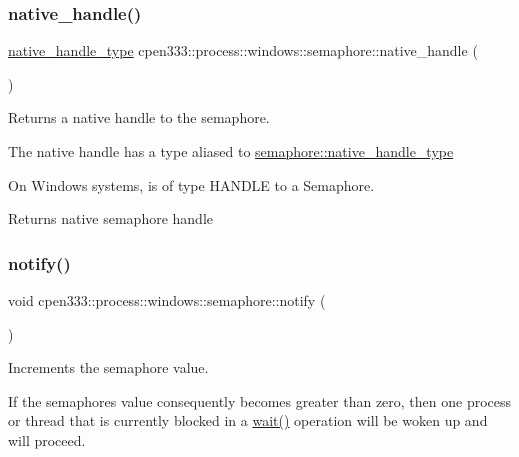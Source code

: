 \subsubsection{\texorpdfstring{native\+\_\+handle()}{native\_handle()}}
{\footnotesize\ttfamily \hyperlink{classcpen333_1_1process_1_1windows_1_1semaphore_aa3e5433587a4f60fc2984eb3509946c9}{native\+\_\+handle\+\_\+type} cpen333\+::process\+::windows\+::semaphore\+::native\+\_\+handle (\begin{DoxyParamCaption}{ }\end{DoxyParamCaption})\hspace{0.3cm}{\ttfamily [inline]}}



Returns a native handle to the semaphore. 

The native handle has a type aliased to \hyperlink{classcpen333_1_1process_1_1windows_1_1semaphore_aa3e5433587a4f60fc2984eb3509946c9}{semaphore\+::native\+\_\+handle\+\_\+type}

On Windows systems, is of type H\+A\+N\+D\+LE to a Semaphore.

\begin{DoxyReturn}{Returns}
native semaphore handle 
\end{DoxyReturn}
\mbox{\label{classcpen333_1_1process_1_1windows_1_1semaphore_a7f1443d55e1112e7b2a15334bafc958b}} 
\subsubsection{\texorpdfstring{notify()}{notify()}}
{\footnotesize\ttfamily void cpen333\+::process\+::windows\+::semaphore\+::notify (\begin{DoxyParamCaption}{ }\end{DoxyParamCaption})\hspace{0.3cm}{\ttfamily [inline]}}



Increments the semaphore value. 

If the semaphore\textquotesingle{}s value consequently becomes greater than zero, then one process or thread that is currently blocked in a \hyperlink{classcpen333_1_1process_1_1windows_1_1semaphore_a523d89b784ed47ade79d4ecf836f042d}{wait()} operation will be woken up and will proceed. \mbox{\label{classcpen333_1_1process_1_1windows_1_1semaphore_a06cffd6c2ed120af0477252fb48b0346}} 
